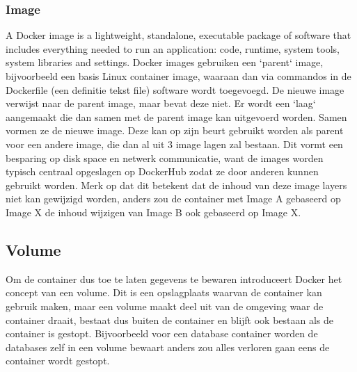 \subsubsection{Image}
A Docker image is a lightweight, standalone, executable package of software that includes everything needed to run an application: code, runtime, system tools, system libraries and settings.\autocite{Docker2023a}
\newline
\newline
Docker images gebruiken een `parent` image, bijvoorbeeld een basis Linux container image, waaraan dan via commandos in de Dockerfile (een definitie tekst file) software wordt toegevoegd. De nieuwe image verwijst naar de parent image, maar bevat deze niet. Er wordt een `laag` aangemaakt die dan samen met de parent image kan uitgevoerd worden. Samen vormen ze de nieuwe image.
Deze kan op zijn beurt gebruikt worden als parent voor een andere image, die dan al uit 3 image lagen zal bestaan. Dit vormt een besparing op disk space en netwerk communicatie, want de images worden typisch centraal opgeslagen op DockerHub zodat ze door anderen kunnen gebruikt worden.
Merk op dat dit betekent dat de inhoud van deze image layers niet kan gewijzigd worden, anders zou de container met Image A gebaseerd op Image X de inhoud wijzigen van Image B ook gebaseerd op Image X. 

\subsection{Volume}
Om de container dus toe te laten gegevens te bewaren introduceert Docker het concept van een volume. Dit is een opslagplaats waarvan de container kan gebruik maken, maar een volume maakt deel uit van de omgeving waar de container draait, bestaat dus buiten de container en blijft ook bestaan als de container is gestopt. Bijvoorbeeld voor een database container worden de databases zelf in een volume bewaart anders zou alles verloren gaan eens de container wordt gestopt.

